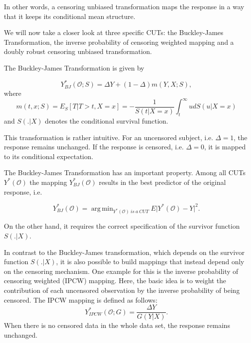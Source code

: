 \documentclass[12pt, a4paper]{article}
\theoremstyle{definition}
\theoremstyle{plain}
\numberwithin{equation}{section}
\numberwithin{figure}{section}
\numberwithin{table}{section}
\DeclareMathOperator*{\argmin}{arg\,min}
\begin{document}
	In other words, a censoring unbiased transformation maps the response in a way that it keeps its conditional mean structure.
	
	We will now take a closer look at three specific CUTs: the Buckley-James Transformation, the inverse probability of censoring weighted mapping and a doubly robust censoring unbiased transformation.
	
	The Buckley-James Transformation is given by
	
	\begin{equation}\label{eq:bjtrafo}
		Y_{BJ}^* (\mathcal{O}; S) = \Delta Y + (1-\Delta)m(Y,X;S),
	\end{equation}
	where
	\begin{equation}\label{eq:condmean}
		m(t,x;S) = E_S[T \vert T > t, X=x] = -\frac{1}{S(t\vert X=x)} \int_t^{\infty} u dS(u\vert X=x)
	\end{equation}%
	and $S(.\vert X)$ denotes the conditional survival function.
	
	This transformation is rather intuitive.
	For an uncensored subject, i.e. $\Delta = 1$, the response remains unchanged.
	If the response is censored, i.e. $\Delta = 0$, it is mapped to its conditional expectation. %
	
	
	The Buckley-James Transformation has an important property.
	Among all CUTs $Y^*(\mathcal{O})$ the mapping $Y_{BJ}^* (\mathcal{O})$ results in the best predictor of the original response, i.e.
	
	\begin{equation*}
	Y_{BJ}^* (\mathcal{O})= \argmin_{Y^*(\mathcal{O})~is~a~CUT} E \vert Y^*(\mathcal{O}) - Y \vert ^2.
	\end{equation*}
	
	On the other hand, it requires the correct specification of the survivor function $S(.\vert X)$.

	
	In contrast to the Buckley-James transformation, which depends on the survivor function $S(.\vert X)$, it is also possible to build mappings that instead depend only on the censoring mechanism.
	One example for this is the inverse probability of censoring weighted (IPCW) mapping.
	Here, the basic idea is to weight the contribution of each uncensored observation by the inverse probability of being censored.
	The IPCW mapping is defined as follows:
	\begin{equation*}
	Y_{IPCW}^*(\mathcal{O}; G) = \frac{\Delta Y}{G(Y \vert X)}.
	\end{equation*}
	When there is no censored data in the whole data set, the response remains unchanged.
	
\end{document}
